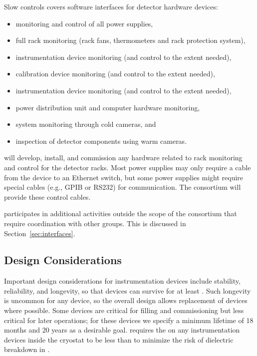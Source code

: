 Slow controls %
covers software interfaces for detector hardware devices:
\begin{itemize}
\item monitoring and control of all power supplies,
\item full rack monitoring (rack fans, thermometers and rack protection system),
\item {} instrumentation device monitoring (and control to the extent needed),
\item calibration device monitoring (and control to the extent needed),
\item {} instrumentation device monitoring (and control to the extent needed),
\item power distribution unit and computer hardware monitoring,
\item {} system monitoring through cold cameras, and
\item inspection of detector components using warm cameras.
\end{itemize}
%
 will develop, install, and commission any hardware related to rack monitoring and control for the detector racks. Most power supplies may only require a cable from the device
to an Ethernet switch, but some power supplies might require special cables (e.g., GPIB or RS232) for communication. The  consortium will provide these control cables.

participates in additional activities outside the scope of the consortium that require coordination with other groups. This is discussed in Section~\ref{sec:interfaces}.

\subsection{Design Considerations}
 
Important design considerations for instrumentation devices include stability, reliability, and longevity, so that devices can survive for at least \dunelifetime. 
Such longevity is uncommon for any device, so the overall design allows replacement of devices where possible.
Some devices are critical for filling and commissioning but less critical for later operations; for these devices we specify a minimum lifetime of 18 months and 20 years as a desirable goal.
 requires the \efield on any instrumentation devices inside the cryostat to be less than \localefield to minimize the risk of dielectric breakdown in \lar. 

